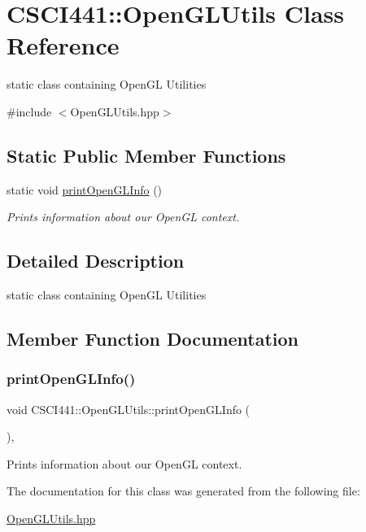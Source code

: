 \hypertarget{class_c_s_c_i441_1_1_open_g_l_utils}{}\section{C\+S\+C\+I441\+:\+:Open\+G\+L\+Utils Class Reference}
\label{class_c_s_c_i441_1_1_open_g_l_utils}


static class containing Open\+GL Utilities  




{\ttfamily \#include $<$Open\+G\+L\+Utils.\+hpp$>$}

\subsection*{Static Public Member Functions}
\begin{DoxyCompactItemize}
\item 
static void \hyperlink{class_c_s_c_i441_1_1_open_g_l_utils_a23e011241f0e95738bafa0b0404eb679}{print\+Open\+G\+L\+Info} ()
\begin{DoxyCompactList}\small\item\em Prints information about our Open\+GL context. \end{DoxyCompactList}\end{DoxyCompactItemize}


\subsection{Detailed Description}
static class containing Open\+GL Utilities 

\subsection{Member Function Documentation}
\mbox{\label{class_c_s_c_i441_1_1_open_g_l_utils_a23e011241f0e95738bafa0b0404eb679}} 
\subsubsection{\texorpdfstring{print\+Open\+G\+L\+Info()}{printOpenGLInfo()}}
{\footnotesize\ttfamily void C\+S\+C\+I441\+::\+Open\+G\+L\+Utils\+::print\+Open\+G\+L\+Info (\begin{DoxyParamCaption}{ }\end{DoxyParamCaption})\hspace{0.3cm}{\ttfamily [inline]}, {\ttfamily [static]}}



Prints information about our Open\+GL context. 



The documentation for this class was generated from the following file\+:\begin{DoxyCompactItemize}
\item 
\hyperlink{_open_g_l_utils_8hpp}{Open\+G\+L\+Utils.\+hpp}\end{DoxyCompactItemize}
